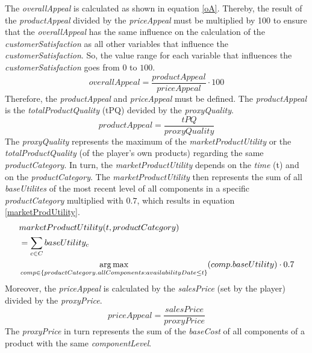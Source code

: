 The \textit{overallAppeal} is calculated as shown in equation \ref{oA}. Thereby, the result of the \textit{productAppeal} divided by the \textit{priceAppeal} must be multiplied by 100 to ensure that the \textit{overallAppeal} has the same influence on the calculation of the \textit{customerSatisfaction} as all other variables that influence the \textit{customerSatisfaction}. So, the value range for each variable that influences the \textit{customerSatisfaction} goes from $0$ to $100$.
\begin{equation}
\label{oA}
overallAppeal = \dfrac{productAppeal}{priceAppeal} \cdot 100
\end{equation}
Therefore, the \textit{productAppeal} and \textit{priceAppeal} must be defined.
The \textit{productAppeal} is the \textit{totalProductQuality} (tPQ) devided by the \textit{proxyQuality}.
\begin{equation}
    productAppeal = \dfrac{tPQ}{proxyQuality}
\end{equation}
The \textit{proxyQuality} represents the maximum of the \textit{marketProductUtility} or the \textit{totalProductQuality} (of the player's own products) regarding the same \textit{productCategory}.
In turn, the \textit{marketProductUtility} depends on the \textit{time} (t) and on the \textit{productCategory}. The \textit{marketProductUtility} then represents the sum of all \textit{baseUtilites} of the most recent level of all components in a specific \textit{productCategory} multiplied with $0.7$, which results in equation \ref{marketProdUtility}.
\begin{equation}
\label{marketProdUtility}
\begin{aligned}
    & marketProductUtility(t, productCategory) \\
    & = \sum_{c \in C} baseUtility_{c} \\
    & \operatorname*{arg\,max}\limits_{comp\in \{productCategory.allComponents: availabilityDate \leq t\}}(comp.baseUtility) \cdot 0.7
\end{aligned}    
\end{equation}
Moreover, the \textit{priceAppeal} is calculated by the \textit{salesPrice} (set by the player) divided by the \textit{proxyPrice}.
\begin{equation}
    priceAppeal = \dfrac{salesPrice}{proxyPrice}
\end{equation}
The \textit{proxyPrice} in turn represents the sum of the \textit{baseCost} of all components of a product with the same \textit{componentLevel}.
